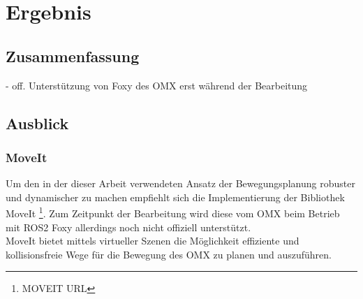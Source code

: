 \section{Ergebnis}
\subsection{Zusammenfassung}
- off. Unterstützung von Foxy des OMX erst während der Bearbeitung
\subsection{Ausblick}
\subsubsection{MoveIt}
Um den in der dieser Arbeit verwendeten Ansatz der Bewegungsplanung robuster und dynamischer zu machen empfiehlt sich die Implementierung der Bibliothek MoveIt \footnote{MOVEIT URL}.
Zum Zeitpunkt der Bearbeitung wird diese vom OMX beim Betrieb mit \ac{ROS2} Foxy allerdings noch nicht offiziell unterstützt.\\
MoveIt bietet mittels virtueller Szenen die Möglichkeit effiziente und kollisionsfreie Wege für die Bewegung des OMX zu planen und auszuführen.

